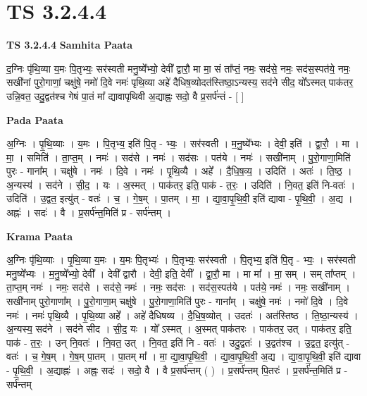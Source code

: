\documentclass[17pt]{extarticle}
\begin{document}

\section{ TS 3.2.4.4 }

\textbf{TS 3.2.4.4 } \newline
\textbf{Samhita Paata} \newline

द॒ग्निः पृ॑थि॒व्या य॒मः पि॒तृभ्यः॒ सर॑स्वती मनु॒ष्ये᳚भ्यो॒ देवी᳚ द्वारौ॒ मा मा॒ सं ता᳚प्तं॒ नमः॒ सद॑से॒ नमः॒ सद॑स॒स्पत॑ये॒ नमः॒ सखी॑नां पुरो॒गाणां॒ चक्षु॑षे॒ नमो॑ दि॒वे नमः॑ पृथि॒व्या अहे॑ दैधिष॒व्योदत॑स्तिष्ठा॒ऽन्यस्य॒ सद॑ने सीद॒ यो᳚ऽस्मत् पाक॑तर॒ उन्नि॒वत॒ उदु॒द्वत॑श्च गेषं पा॒तं मा᳚ द्यावापृथिवी अ॒द्याह्नः॒ सदो॒ वै प्र॒सर्प॑न्तं - [  ] \newline

\textbf{Pada Paata} \newline

अ॒ग्निः । पृ॒थि॒व्याः । य॒मः । पि॒तृभ्य॒ इति॑ पि॒तृ - भ्यः॒ । सर॑स्वती । म॒नु॒ष्ये᳚भ्यः । देवी॒ इति॑ । द्वा॒रौ॒ । मा । मा॒ । समिति॑ । ता॒प्त॒म् । नमः॑ । सद॑से । नमः॑ । सद॑सः । पत॑ये । नमः॑ । सखी॑नाम् । पु॒रो॒गाणा॒मिति॑ पुरः - गाना᳚म् । चक्षु॑षे । नमः॑ । दि॒वे । नमः॑ । पृ॒थि॒व्यै । अहे᳚ । दै॒धि॒ष॒व्य॒ । उदिति॑ । अतः॑ । ति॒ष्ठ॒ । अ॒न्यस्य॑ । सद॑ने । सी॒द॒ । यः । अ॒स्मत् । पाक॑तर॒ इति॒ पाक॑ - त॒रः॒ । उदिति॑ । नि॒वत॒ इति॑ नि-वतः॑ । उदिति॑ । उ॒द्वत॒ इत्यु॑त् - वतः॑ । च॒ । गे॒ष॒म् । पा॒तम् । मा॒ । द्या॒वा॒पृ॒थि॒वी॒ इति॑ द्यावा - पृ॒थि॒वी॒ । अ॒द्य । अह्नः॑ । सदः॑ । वै । प्र॒सर्प॑न्त॒मिति॑ प्र - सर्प॑न्तम् ।  \newline


\textbf{Krama Paata} \newline

अ॒ग्निः पृ॑थि॒व्याः । पृ॒थि॒व्या य॒मः । य॒मः पि॒तृभ्यः॑ । पि॒तृभ्यः॒ सर॑स्वती । पि॒तृभ्य॒ इति॑ पि॒तृ - भ्यः॒ । सर॑स्वती मनु॒ष्ये᳚भ्यः । म॒नु॒ष्ये᳚भ्यो॒ देवी᳚ । देवी᳚ द्वारौ । देवी॒ इति॒ देवी᳚ । द्वा॒रौ॒ मा । मा मा᳚ । मा॒ सम् । सम् ता᳚प्तम् । ता॒प्त॒म् नमः॑ । नमः॒ सद॑से । सद॑से॒ नमः॑ । नमः॒ सद॑सः । सद॑स॒स्पत॑ये । पत॑ये॒ नमः॑ । नमः॒ सखी॑नाम् । सखी॑नाम् पुरो॒गाणा᳚म् । पु॒रो॒गाणा॒म् चक्षु॑षे । पु॒रो॒गाणा॒मिति॑ पुरः - गाना᳚म् । चक्षु॑षे॒ नमः॑ । नमो॑ दि॒वे । दि॒वे नमः॑ । नमः॑ पृथि॒व्यै । पृ॒थि॒व्या अहे᳚ । अहे॑ दैधिषव्य । दै॒धि॒॒ष॒व्योत् । उदतः॑ । अत॑स्तिष्ठ । ति॒ष्ठा॒न्यस्य॑ । अ॒न्यस्य॒ सद॑ने । सद॑ने सीद । सी॒द॒ यः । यो᳚ ऽस्मत् । अ॒स्मत् पाक॑तरः । पाक॑तर॒ उत् । पाक॑तर॒ इति॒ पाक॑ - त॒रः॒ । उन् नि॒वतः॑ । नि॒वत॒ उत् । नि॒वत॒ इति॑ नि - वतः॑ । उदु॒द्वतः॑ । उ॒द्वत॑श्च । उ॒द्वत॒ इत्यु॑त् - वतः॑ । च॒ गे॒ष॒म् । गे॒ष॒म् पा॒तम् । पा॒तम् मा᳚ । मा॒ द्या॒वा॒पृ॒थि॒वी॒ । द्या॒वा॒पृ॒थि॒वी॒ अ॒द्य । द्या॒वा॒पृ॒थि॒वी॒ इति॑ द्यावा - पृ॒थि॒वी॒ । अ॒द्याह्नः॑ । अह्नः॒ सदः॑ । सदो॒ वै । वै प्र॒सर्प॑न्तम् ( ) । प्र॒सर्प॑न्तम् पि॒तरः॑ । प्र॒सर्प॑न्त॒मिति॑ प्र - सर्प॑न्तम् \newline
\end{document}
